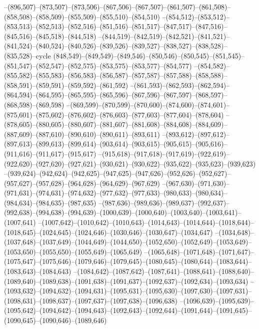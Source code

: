 --(896,507)--(873,507)--(873,506)--(867,506)--(867,507)--(861,507)--(861,508)--(858,508)--(858,509)--(855,509)--(855,510)--(854,510)
--(854,512)--(853,512)--(853,513)--(852,513)--(852,516)--(851,516)--(851,517)--(847,517)--(847,516)--(845,516)--(845,518)--(844,518)
--(844,519)--(842,519)--(842,521)--(841,521)--(841,524)--(840,524)--(840,526)--(839,526)--(839,527)--(838,527)--(838,528)--(835,528)--cycle
(848,549)--(849,549)--(849,546)--(850,546)--(850,545)--(851,545)--(851,547)--(852,547)--(852,575)--(853,575)--(853,577)--(854,577)
--(854,582)--(855,582)--(855,583)--(856,583)--(856,587)--(857,587)--(857,588)--(858,588)--(858,591)--(859,591)--(859,592)--(861,592)
--(861,593)--(862,593)--(862,594)--(864,594)--(864,595)--(865,595)--(865,596)--(867,596)--(867,597)--(868,597)--(868,598)--(869,598)
--(869,599)--(870,599)--(870,600)--(874,600)--(874,601)--(875,601)--(875,602)--(876,602)--(876,603)--(877,603)--(877,604)--(878,604)
--(878,605)--(880,605)--(880,607)--(881,607)--(881,608)--(884,608)--(884,609)--(887,609)--(887,610)--(890,610)--(890,611)--(893,611)
--(893,612)--(897,612)--(897,613)--(899,613)--(899,614)--(903,614)--(903,615)--(905,615)--(905,616)--(911,616)--(911,617)--(915,617)
--(915,618)--(917,618)--(917,619)--(922,619)--(922,620)--(927,620)--(927,621)--(930,621)--(930,622)--(935,622)--(935,623)--(939,623)
--(939,624)--(942,624)--(942,625)--(947,625)--(947,626)--(952,626)--(952,627)--(957,627)--(957,628)--(964,628)--(964,629)--(967,629)
--(967,630)--(971,630)--(971,631)--(974,631)--(974,632)--(977,632)--(977,633)--(980,633)--(980,634)--(984,634)--(984,635)--(987,635)
--(987,636)--(989,636)--(989,637)--(992,637)--(992,638)--(994,638)--(994,639)--(1000,639)--(1000,640)--(1003,640)--(1003,641)--(1007,641)
--(1007,642)--(1010,642)--(1010,643)--(1014,643)--(1014,644)--(1018,644)--(1018,645)--(1024,645)--(1024,646)--(1030,646)--(1030,647)--(1034,647)
--(1034,648)--(1037,648)--(1037,649)--(1044,649)--(1044,650)--(1052,650)--(1052,649)--(1053,649)--(1053,650)--(1055,650)--(1055,649)--(1065,649)
--(1065,648)--(1071,648)--(1071,647)--(1075,647)--(1075,646)--(1079,646)--(1079,645)--(1080,645)--(1080,644)--(1083,644)--(1083,643)--(1084,643)
--(1084,642)--(1087,642)--(1087,641)--(1088,641)--(1088,640)--(1089,640)--(1089,638)--(1091,638)--(1091,637)--(1092,637)--(1092,634)--(1093,634)
--(1093,632)--(1094,632)--(1094,631)--(1095,631)--(1095,630)--(1097,630)--(1097,631)--(1098,631)--(1098,637)--(1097,637)--(1097,638)--(1096,638)
--(1096,639)--(1095,639)--(1095,642)--(1094,642)--(1094,643)--(1092,643)--(1092,644)--(1091,644)--(1091,645)--(1090,645)--(1090,646)--(1089,646)
